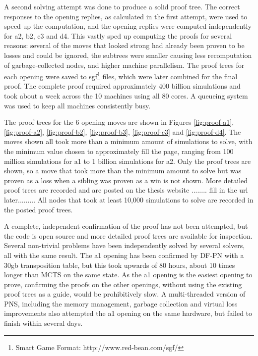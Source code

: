 A second solving attempt was done to produce a solid proof tree. The correct responses to the opening replies, as calculated in the first attempt, were used to speed up the computation, and the opening replies were computed independently for a2, b2, c3 and d4. This vastly sped up computing the proofs for several reasons: several of the moves that looked strong had already been proven to be losses and could be ignored, the subtrees were smaller causing less recomputation of garbage-collected nodes, and higher machine parallelism. The proof trees for each opening were saved to sgf\footnote{Smart Game Format: http://www.red-bean.com/sgf/} files, which were later combined for the final proof. The complete proof required approximately 400 billion simulations and took about a week across the 10 machines using all 80 cores. A queueing system was used to keep all machines consistently busy.

The proof trees for the 6 opening moves are shown in Figures \ref{fig:proof-a1}, \ref{fig:proof-a2}, \ref{fig:proof-b2}, \ref{fig:proof-b3}, \ref{fig:proof-c3} and \ref{fig:proof-d4}. The moves shown all took more than a minimum amount of simulations to solve, with the minimum value chosen to approximately fill the page, ranging from 100 million simulations for a1 to 1 billion simulations for a2. Only the proof trees are shown, so a move that took more than the minimum amount to solve but was proven as a loss when a sibling was proven as a win is not shown. More detailed proof trees are recorded and are posted on the thesis website ........ fill in the url later......... All nodes that took at least 10,000 simulations to solve are recorded in the posted proof trees.

A complete, independent confirmation of the proof has not been attempted, but the code is open source and more detailed proof trees are available for inspection. Several non-trivial problems have been independently solved by several solvers, all with the same result. The a1 opening has been confirmed by DF-PN with a 30gb transposition table, but this took upwards of 80 hours, about 10 times longer than MCTS on the same state. As the a1 opening is the easiest opening to prove, confirming the proofs on the other openings, without using the existing proof trees as a guide, would be prohibitively slow. A multi-threaded version of PNS, including the memory management, garbage collection and virtual loss improvements also attempted the a1 opening on the same hardware, but failed to finish within several days.

